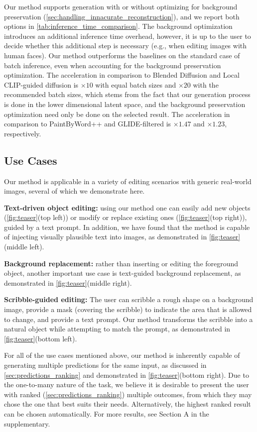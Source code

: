 Our method supports generation with or without optimizing for background preservation (\ref{sec:handling_innacurate_reconstruction}), and we report both options in \ref{tab:inference_time_comparison}. The background optimization introduces an additional inference time overhead, however, it is up to the user to decide whether this additional step is necessary (e.g., when editing images with human faces). Our method outperforms the baselines on the standard case of batch inference, even when accounting for the background preservation optimization. The acceleration in comparison to Blended Diffusion and Local CLIP-guided diffusion is $\times 10$ with equal batch sizes and $\times 20$ with the recommended batch sizes, which stems from the fact that our generation process is done in the lower dimensional latent space, and the background preservation optimization need only be done on the selected result. The acceleration in comparison to PaintByWord++ and GLIDE-filtered is $\times 1.47$ and $\times 1.23$, respectively.

\subsection{Use Cases} Our method is applicable in a variety of editing scenarios with generic real-world images, several of which we demonstrate here.

\textbf{Text-driven object editing:} using our method one can easily add new objects (\ref{fig:teaser}(top left)) or modify or replace existing ones (\ref{fig:teaser}(top right)), guided by a text prompt. In addition, we have found that the method is capable of injecting visually plausible text into images, as demonstrated in \ref{fig:teaser}(middle left).

\textbf{Background replacement:} rather than inserting or editing the foreground object, another important use case is text-guided background replacement, as demonstrated in \ref{fig:teaser}(middle right).

\textbf{Scribble-guided editing:} The user can scribble a rough shape on a background image, provide a mask (covering the scribble) to indicate the area that is allowed to change, and provide a text prompt. Our method transforms the scribble into a natural object while attempting to match the prompt, as demonstrated in \ref{fig:teaser}(bottom left).

For all of the use cases mentioned above, our method is inherently capable of generating multiple predictions for the same input, as discussed in \ref{sec:predictions_ranking} and demonstrated in \ref{fig:teaser}(bottom right). Due to the one-to-many nature of the task, we believe it is desirable to present the user with ranked (\ref{sec:predictions_ranking}) multiple outcomes, from which they may chose the one that best suits their needs. Alternatively, the highest ranked result can be chosen automatically.  For more results, see Section A in the supplementary.

